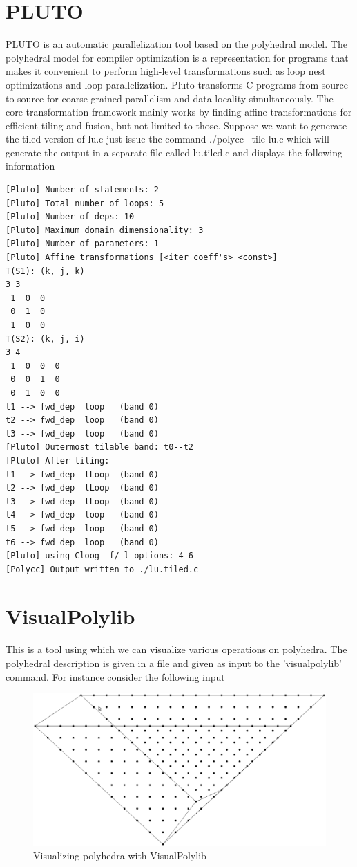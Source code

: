 \documentclass[MTech]{iitmdiss}
\begin{document}
\section{PLUTO}
PLUTO is an automatic parallelization tool based on the polyhedral model. The polyhedral model
for compiler optimization is a representation for programs that makes it convenient to perform
high-level transformations such as loop nest optimizations and loop parallelization. Pluto transforms
C programs from source to source for coarse-grained parallelism and data locality simultaneously.
The core transformation framework mainly works by finding affine transformations for efficient
tiling and fusion, but not limited to those.
Suppose we want to generate the tiled version of lu.c just issue the command
./polycc --tile lu.c
which will generate the output in a separate file called lu.tiled.c and displays
the following information
{\footnotesize
\begin{lstlisting}
[Pluto] Number of statements: 2
[Pluto] Total number of loops: 5
[Pluto] Number of deps: 10
[Pluto] Maximum domain dimensionality: 3
[Pluto] Number of parameters: 1
[Pluto] Affine transformations [<iter coeff's> <const>]
T(S1): (k, j, k)
3 3
 1  0  0 
 0  1  0 
 1  0  0 
T(S2): (k, j, i)
3 4
 1  0  0  0 
 0  0  1  0 
 0  1  0  0 
t1 --> fwd_dep  loop   (band 0)
t2 --> fwd_dep  loop   (band 0)
t3 --> fwd_dep  loop   (band 0)
[Pluto] Outermost tilable band: t0--t2
[Pluto] After tiling:
t1 --> fwd_dep  tLoop  (band 0)
t2 --> fwd_dep  tLoop  (band 0)
t3 --> fwd_dep  tLoop  (band 0)
t4 --> fwd_dep  loop   (band 0)
t5 --> fwd_dep  loop   (band 0)
t6 --> fwd_dep  loop   (band 0)
[Pluto] using Cloog -f/-l options: 4 6
[Polycc] Output written to ./lu.tiled.c
\end{lstlisting}
}
\section{VisualPolylib}
This is a tool using which we can visualize various operations on polyhedra. The polyhedral
description is given in a file and given as input to the 'visualpolylib' command.
For instance consider the following input
\begin{figure}
\begin{center}
  \includegraphics[width=1\textwidth]{images/3d.eps}
  \caption{Visualizing polyhedra with VisualPolylib}
  \label{fig:3d}
\end{center}  
\end{figure}
\end{document}
